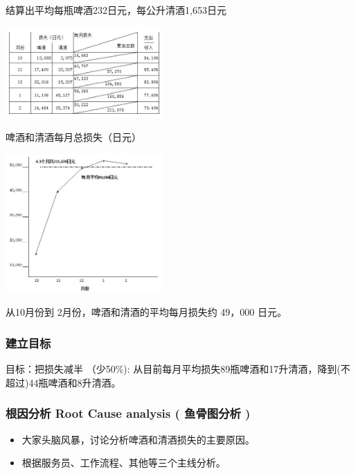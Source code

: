 结算出平均每瓶啤酒232日元，每公升清酒1,653日元


\includegraphics[width=6cm]{club81.jpg}

啤酒和清酒每月总损失（日元）


\includegraphics[width=6cm]{club91.jpg}

从10月份到 2月份，啤酒和清酒的平均每月损失约 49，000 日元。

\hypertarget{ux5efaux7acbux76eeux6807}{%
\subsubsection{建立目标}\label{ux5efaux7acbux76eeux6807}}

目标：把损失减半 （少50\%):
从目前每月平均损失89瓶啤酒和17升清酒，降到(不超过)44瓶啤酒和8升清酒。

\hypertarget{ux6839ux56e0ux5206ux6790-root-cause-analysis-ux9c7cux9aa8ux56feux5206ux6790}{%
\subsubsection{根因分析 Root Cause analysis ( 鱼骨图分析
)}\label{ux6839ux56e0ux5206ux6790-root-cause-analysis-ux9c7cux9aa8ux56feux5206ux6790}}

\begin{itemize}
\tightlist
\item
  大家头脑风暴，讨论分析啤酒和清酒损失的主要原因。
\item
  根据服务员、工作流程、其他等三个主线分析。
\end{itemize}

